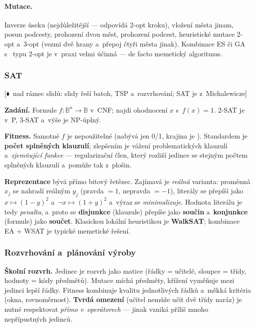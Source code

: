 \documentclass[11pt,a4paper]{article}
\theoremstyle{definition}
\newcommand{\mimoq}[1]{\textcolor{markcol}{\textsf{\footnotesize[$\blacklozenge$~nad rámec slidů: #1]}}}
\begin{document}
\paragraph{Mutace.} Inverze úseku (nejdůležitější --- odpovídá 2-opt kroku),
vložení města jinam, posun podcesty, prohození dvou měst, prohození podcest,
heuristické mutace 2-opt a~3-opt (vezmi dvě hrany a~přepoj čtyři města jinak).
Kombinace ES či GA s~ typu 2-opt je v~praxi velmi
účinná --- de facto memetický algoritmus.

\subsubsection{SAT}

\noindent\mimoq{slidy řeší batoh, TSP a~rozvrhování; SAT je z~Michalewicze}

\textbf{Zadání.} Formule $f: \mathbb{B}^n \to \mathbb{B}$ v~CNF; najdi ohodnocení $x$
s~$f(x)=1$. 2-SAT je v~P, 3-SAT a~výše je NP-úplný.

\textbf{Fitness.} Samotné $f$ je nepoužitelné (nabývá jen 0/1, krajina je ). Standardem je \textbf{počet splněných klauzulí}; zlepšením je vážení problematických
klauzulí a~\emph{zjemňující funkce} --- regularizační člen, který rozliší jedince se stejným
počtem splněných klauzulí a~pomůže tak z~plošin.

\textbf{Reprezentace} bývá přímo bitový řetězec. Zajímavá je \emph{reálná} varianta:
proměnná $x_j$ se nahradí reálným $y_j$ (pravda $=1$, nepravda $=-1$), literály se přepíší
jako $x \mapsto (1-y)^2$ a~$\neg x \mapsto (1+y)^2$ a~výraz se \emph{minimalizuje}. Hodnota
literálu je tedy \emph{penalta}, a~proto se \textbf{disjunkce} (klauzule) přepíše jako
\textbf{součin} a~\textbf{konjunkce} (formule) jako \textbf{součet}. Klasickou lokální
heuristikou je \textbf{WalkSAT}; kombinace EA + WSAT je typické memetické řešení.

\subsubsection{Rozvrhování a~plánování výroby}

\textbf{Školní rozvrh.} Jedinec je rozvrh jako matice (řádky = učitelé, sloupce = třídy,
hodnoty = kódy předmětů). Mutace míchá předměty, křížení vyměňuje mezi jedinci lepší řádky.
Fitness kombinuje kvalitu jednotlivých řádků a~měkká kritéria (okna, rovnoměrnost).
\textbf{Tvrdá omezení} (učitel nemůže učit dvě třídy naráz) je nutné respektovat
\emph{přímo v~operátorech} --- jinak vzniká příliš mnoho nepřípustných jedinců.
\end{document}
